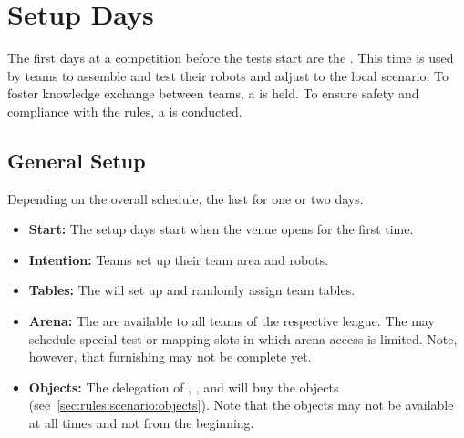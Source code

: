 \chapter{Setup Days}
\label{chap:setupdays}
The first days at a \RoboCup\AtHome{} competition before the tests start are the \SetupDays{}. This time is used by teams to assemble and test their robots and adjust to the local scenario. To foster knowledge exchange between teams, a \PS{} is held. To ensure safety and compliance with the rules, a \RobotInspection{} is conducted.


\section{General Setup}
\label{sec:setupdays:general}
Depending on the overall \RoboCup{} schedule, the \SetupDays{} last for one or two days.

\begin{itemize}
	\item \textbf{Start:} The setup days start when the venue opens for the first time.
	\item \textbf{Intention:} Teams set up their team area and robots.
	\item \textbf{Tables:} The  will set up and randomly assign team tables.
	\item \textbf{Arena:} The \Arenas{} are available to all teams of the respective league. The  may schedule special test or mapping slots in which arena access is limited. Note, however, that furnishing may not be complete yet.
	\item \textbf{Objects:} The delegation of , ,  and  will buy the objects (see~\ref{sec:rules:scenario:objects}). Note that the objects may not be available at all times and not from the beginning.
\end{itemize}

